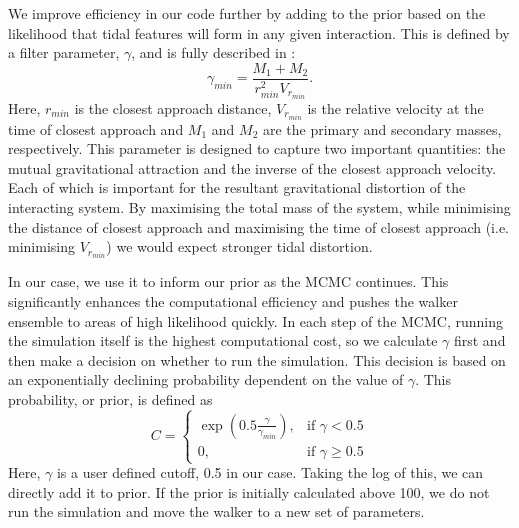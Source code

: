 We improve efficiency in our code further by adding to the prior based on the likelihood that tidal features will form in any given interaction. This is defined by a filter parameter, $\gamma$, and is fully described in \citet[][where it is called $\beta$ but we call it $\gamma$ here to not be confused with our star formation enhancement parameter of Equation \ref{enhancement_param}]{2016MNRAS.459..720H}:
\begin{equation}\label{gamma_param}
\gamma_{min} = \frac{M_{1} + M_{2}}{r_{min}^{2}V_{r_{min}}}.
\end{equation}
Here, $r_{min}$ is the closest approach distance, $V_{r_{min}}$ is the relative velocity at the time of closest approach and $M_{1}$ and $M_{2}$ are the primary and secondary masses, respectively. This parameter is designed to capture two important quantities: the mutual gravitational attraction and the inverse of the closest approach velocity. Each of which is important for the resultant gravitational distortion of the interacting system. By maximising the total mass of the system, while minimising the distance of closest approach and maximising the time of closest approach (i.e. minimising $V_{r_{min}}$) we would expect stronger tidal distortion. 

In our case, we use it to inform our prior as the MCMC continues. This significantly enhances the computational efficiency and pushes the walker ensemble to areas of high likelihood quickly. In each step of the MCMC, running the simulation itself is the highest computational cost, so we calculate $\gamma$ first and then make a decision on whether to run the simulation. This decision is based on an exponentially declining probability dependent on the value of $\gamma$. This probability, or prior, is defined as 
\begin{equation}\label{tidal_prob}
C = 
\begin{cases}
\exp(0.5\frac{\gamma}{\gamma_{min}}), & \text{if } \gamma < 0.5 \\
0, & \text{if } \gamma \geq 0.5
\end{cases}
\end{equation}
Here, $\gamma$ is a user defined cutoff, 0.5 in our case. Taking the log of this, we can directly add it to prior. If the prior is initially calculated above 100, we do not run the simulation and move the walker to a new set of parameters.

